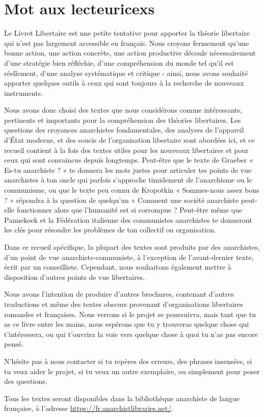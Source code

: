 \chapter*{Mot aux lecteuricexs}

Le Livret Libertaire est une petite tentative pour apporter la théorie libertaire qui n'est pas largement accessible en français. Nous croyons fermement qu'une bonne action, une action concrète, une action productive découle nécessairement d'une stratégie bien réfléchie, d'une compréhension du monde tel qu'il est réellement, d'une analyse systématique et critique - ainsi, nous avons souhaité apporter quelques outils à ceux qui sont toujours à la recherche de nouveaux instruments.

Nous avons donc choisi des textes que nous considérons comme intéressants, pertinents et importants pour la compréhension des théories libertaires. Les questions des croyances anarchistes fondamentales, des analyses de l'appareil d'État moderne, et des soucis de l'organisation libertaire sont abordées ici, et ce recueil contient à la fois des textes utiles pour les nouveaux libertaires et pour ceux qui sont convaincus depuis longtemps. Peut-être que le texte de Graeber « Es-tu anarchiste ? » te donnera les mots justes pour articuler tes points de vue anarchistes à ton oncle qui parfois s’approche timidement de l’anarchisme ou le communisme, ou que le texte peu connu de Kropotkin « Sommes-nous assez bons ? » répondra à la question de quelqu'un « Comment une société anarchiste peut-elle fonctionner alors que l'humanité est si corrompue ? Peut-être même que Pannekoek et la Fédération italienne des communistes anarchistes te donneront les clés pour résoudre les problèmes de ton collectif ou organisation.

Dans ce recueil spécifique, la plupart des textes sont produits par des anarchistes, d'un point de vue anarchiste-communiste, à l'exception de l'avant-dernier texte, écrit par un conseilliste. Cependant, nous souhaitons également mettre à disposition d'autres points de vue libertaires.

Nous avons l'intention de produire d'autres brochures, contenant d'autres traductions et même des textes obscurs provenant d'organisations libertaires romandes et françaises. Nous verrons si le projet se poursuivra, mais tant que tu as ce livre entre les mains, nous espérons que tu y trouveras quelque chose qui t’intéressera, ou qui t’ouvrira la voie vers quelque chose à quoi tu n’as pas encore pensé.

N’hésite pas à nous contacter si tu repères des erreurs, des phrases insensées, si tu veux aider le projet, si tu veux un autre exemplaire, ou simplement pour poser des questions.

Tous les textes seront disponibles dans la bibliothèque anarchiste de langue française, à l'adresse \url{https://fr.anarchistlibraries.net/}.


